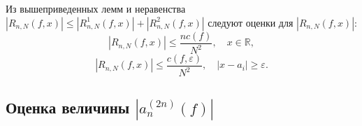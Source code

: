 Из вышеприведенных лемм и неравенства $\left|R_{n,N}(f,x)\right|\leq\left|R_{n,N}^{1}(f,x)\right|+\left|R_{n,N}^{2}(f,x)\right|$
следуют оценки для $\left|R_{n,N}(f,x)\right|$:
\begin{equation}
\left|R_{n,N}(f,x)\right|\leq\frac{nc(f)}{N^2},\quad x\in\mathbb{R},\label{eq:R_est1}
\end{equation}
\begin{equation}
\left|R_{n,N}(f,x)\right|\leq\frac{c(f,\varepsilon)}{N^{2}},\quad\left|x-a_{i}\right|\geq\varepsilon.\label{eq:R_est2}
\end{equation}

\subsection{Оценка величины $\left|a_{n}^{(2n)}(f)\right|$}

